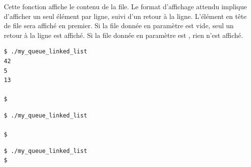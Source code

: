 \noindent Cette fonction affiche le contenu de la file.
Le format d'affichage attendu implique d'afficher un seul élément par ligne, suivi d'un retour à la ligne.
L'élément en tête de file sera affiché en premier.
Si la file donnée en paramètre est vide, seul un retour à la ligne est affiché.
Si la file donnée en paramètre est , rien n'est affiché.

\bigskip

\lstset{language=sh}
\begin{lstlisting}[frame=single,title={Exemple d'affichage du cas normal : file contenant 42, 5, 13}]
$ ./my_queue_linked_list
42
5
13

$
\end{lstlisting}

\bigskip

\lstset{language=sh}
\begin{lstlisting}[frame=single,title={Exemple d'affichage d'une file vide}]
$ ./my_queue_linked_list

$
\end{lstlisting}

\bigskip

\lstset{language=sh}
\begin{lstlisting}[frame=single,title={Exemple d'affichage d'un pointeur NULL}]
$ ./my_queue_linked_list
$
\end{lstlisting}